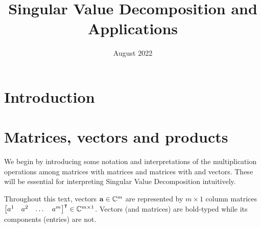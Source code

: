 \documentclass{article}
\title{Singular Value Decomposition and Applications}
\author{}
\date{August 2022}
\begin{document}
\maketitle

\section{Introduction}
\section{Matrices, vectors and products}
We begin by introducing some notation and interpretations of the multiplication operations among matrices with matrices and matrices with and vectors. These will be essential for interpreting Singular Value Decomposition intuitively. 

Throughout this text, vectors $\vb{a}\in\mathbb{C}^m$ are represented by $m\times 1$ column matrices $\mqty[a^1 & a^2 & \dots & a^m]^{\intercal}\in\mathbb{C}^{m \times 1} $. Vectors (and matrices) are bold-typed while its components (entries) are not. 
\end{document}
